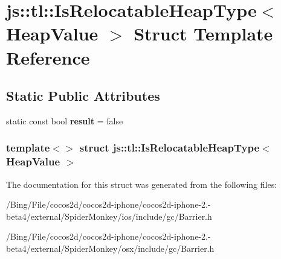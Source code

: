 \hypertarget{structjs_1_1tl_1_1_is_relocatable_heap_type_3_01_heap_value_01_4}{\section{js\-:\-:tl\-:\-:Is\-Relocatable\-Heap\-Type$<$ Heap\-Value $>$ Struct Template Reference}
\label{structjs_1_1tl_1_1_is_relocatable_heap_type_3_01_heap_value_01_4}
}
\subsection*{Static Public Attributes}
\begin{DoxyCompactItemize}
\item 
\hypertarget{structjs_1_1tl_1_1_is_relocatable_heap_type_3_01_heap_value_01_4_a1360de13f2c76dd604c8c65ed5a6a524}{static const bool {\bfseries result} = false}\label{structjs_1_1tl_1_1_is_relocatable_heap_type_3_01_heap_value_01_4_a1360de13f2c76dd604c8c65ed5a6a524}

\end{DoxyCompactItemize}
\subsubsection*{template$<$$>$ struct js\-::tl\-::\-Is\-Relocatable\-Heap\-Type$<$ Heap\-Value $>$}



The documentation for this struct was generated from the following files\-:\begin{DoxyCompactItemize}
\item 
/\-Bing/\-File/cocos2d/cocos2d-\/iphone/cocos2d-\/iphone-\/2.-\/beta4/external/\-Spider\-Monkey/ios/include/gc/Barrier.\-h\item 
/\-Bing/\-File/cocos2d/cocos2d-\/iphone/cocos2d-\/iphone-\/2.-\/beta4/external/\-Spider\-Monkey/osx/include/gc/Barrier.\-h\end{DoxyCompactItemize}
